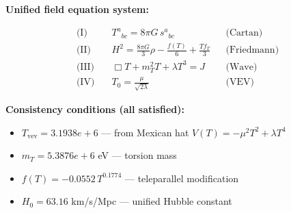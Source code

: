 
\textbf{Unified field equation system:}

\begin{align}
  \text{(I)} \quad & T^a{}_{bc} = 8\pi G \, s^a{}_{bc} && \text{(Cartan)} \\
  \text{(II)} \quad & H^2 = \frac{8\pi G}{3}\rho - \frac{f(T)}{6} + \frac{Tf_T}{3} && \text{(Friedmann)} \\
  \text{(III)} \quad & \Box T + m_T^2 T + \lambda T^3 = J && \text{(Wave)} \\
  \text{(IV)} \quad & T_0 = \frac{\mu}{\sqrt{2\lambda}} && \text{(VEV)}
\end{align}

\textbf{Consistency conditions (all satisfied):}
\begin{itemize}
  \item $T_{\text{vev}} = 3.1938e+6$ — from Mexican hat $V(T) = -\mu^2 T^2 + \lambda T^4$
  \item $m_T = 5.3876e+6$ eV — torsion mass
  \item $f(T) = -0.0552 \, T^{0.1774}$ — teleparallel modification
  \item $H_0 = 63.16$ km/s/Mpc — unified Hubble constant
\end{itemize}